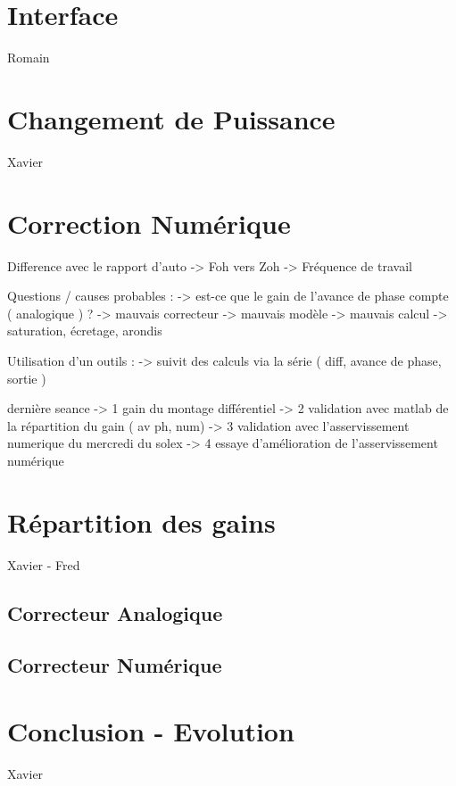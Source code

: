 \documentclass[11pt, french]{article} %
\begin{document}
\section{Interface}
Romain
\section{Changement de Puissance}
Xavier
\section{Correction Numérique}

Difference avec le rapport d'auto
-> Foh vers Zoh
-> Fréquence de travail

Questions / causes probables :
-> est-ce que le gain de l'avance de phase compte ( analogique ) ?
-> mauvais correcteur
-> mauvais modèle
-> mauvais calcul -> saturation, écretage, arondis

Utilisation d'un outils :
-> suivit des calculs via la série ( diff, avance de phase, sortie )

dernière seance
-> 1 gain du montage différentiel
-> 2 validation avec matlab de la répartition du gain ( av ph, num)
-> 3 validation avec l'asservissement numerique du mercredi du solex
-> 4 essaye d'amélioration de l'asservissement numérique


\section{Répartition des gains}
Xavier - Fred
\subsection{Correcteur Analogique}
\subsection{Correcteur Numérique}
\section*{Conclusion - Evolution}
Xavier
\end{document}
